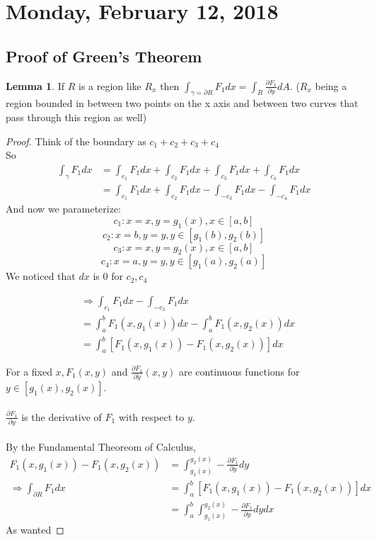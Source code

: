 \documentclass[12pt]{article}
\theoremstyle{plain}
\theoremstyle{definition}
\newtheorem{lemma}[theorem]{Lemma}
\begin{document}
\newpage

\section{Monday, February 12, 2018}

\subsection{Proof of Green's Theorem}

\begin{lemma}
	If $R$ is a region like $R_x$ then $\int_{\gamma = \partial R} F_1 dx = \int_R \frac{\partial F_1}{\partial y} dA$. ($R_x$ being a region bounded in between two points on the x axis and between two curves that pass through this region as well)
\end{lemma}

\begin{proof}
	Think of the boundary as $c_1 + c_2 + c_3 + c_4$\\
	So
	\begin{align*}
		\int_\gamma F_1 dx &= \int_{c_1} F_1 dx + \int_{c_2} F_1 dx + \int_{c_3} F_1 dx + \int_{c_4} F_1 dx\\
		&= \int_{c_1} F_1 dx + \int_{c_2} F_1 dx -\int_{-c_3} F_1 dx -\int_{-c_4} F_1 dx
	\end{align*}
	And now we parameterize:
	$$c_1 : x=x, y=g_1(x), x\in [a,b]$$
	$$c_2 : x=b, y=y, y \in [g_1 (b), g_2 (b)]$$
	$$c_3 : x=x, y=g_2(x), x\in [a,b]$$
	$$c_4 : x=a, y=y, y \in [g_1 (a), g_2 (a)]$$
	We noticed that $dx$ is 0 for $c_2, c_4$

	\begin{align*}
		&\Longrightarrow \int_{c_1} F_1 dx  -\int_{-c_3} F_1 dx\\
		&=\int^b_a F_1 (x,g_1 (x))dx - \int^b_a F_1 (x,g_2 (x))dx\\
		&=\int^b_a [F_1 (x,g_1 (x)) - F_1 (x,g_2 (x))]dx
	\end{align*}

	For a fixed $x, F_1 (x,y)$ and $\frac{\partial F_1}{\partial y} (x,y)$ are continuous functions for $y\in [g_1 (x), g_2 (x)]$.\\
	\\
	$\frac{\partial F_1}{\partial y}$ is the derivative of $F_1$ with respect to $y$.\\
	\\
	By the Fundamental Theoreom of Calculus,
	\begin{align*}
		F_1 (x,g_1 (x)) - F_1 (x,g_2(x)) &= \int^{g_2(x)}_{g_1(x)} - \frac{\partial F_1}{\partial y} dy\\
		\Longrightarrow \int_{\partial R} F_1 dx &= \int^b_a [F_1 (x,g_1 (x)) - F_1 (x,g_2 (x))]dx\\
		&= \int^b_a \int^{g_2(x)}_{g_1(x)} - \frac{\partial F_1}{\partial y} dy dx
	\end{align*}
	As wanted

\end{proof}
\end{document}
